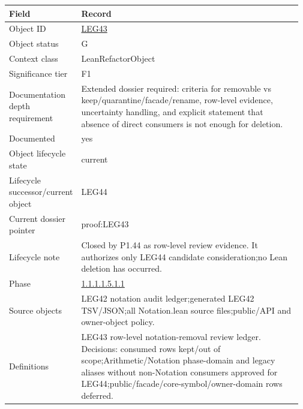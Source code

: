 \begin{longtable}{L{0.16\linewidth} L{0.81\linewidth}}
\hline
\textbf{Field} & \textbf{Record}\\
\hline
Object ID & \hyperlink{object-row-LEG43}{LEG43}\\
\hline\addlinespace[0.20em]
Object status & G\\
\hline\addlinespace[0.20em]
Context class & LeanRefactorObject\\
\hline\addlinespace[0.20em]
Significance tier & F1\\
\hline\addlinespace[0.20em]
Documentation depth requirement & Extended dossier required: criteria for removable vs keep/\allowbreak{}quarantine/\allowbreak{}facade/\allowbreak{}rename, row-level evidence, uncertainty handling, and explicit statement that absence of direct consumers is not enough for deletion.\\
\hline\addlinespace[0.20em]
Documented & yes\\
\hline\addlinespace[0.20em]
Object lifecycle state & current\\
\hline\addlinespace[0.20em]
Lifecycle successor/\allowbreak{}current object & LEG44\\
\hline\addlinespace[0.20em]
Current dossier pointer & proof:LEG43\\
\hline\addlinespace[0.20em]
Lifecycle note & Closed by P1.44 as row-level review evidence. It authorizes only LEG44 candidate consideration;\newline no Lean deletion has occurred.\\
\hline\addlinespace[0.20em]
Phase & \hyperlink{phase-row-1-1-1-1-5-1-1}{1.1.1.1.5.1.1}\\
\hline\addlinespace[0.20em]
Source objects & LEG42 notation audit ledger;\newline generated LEG42 TSV/\allowbreak{}JSON;\newline all Notation.lean source files;\newline public/\allowbreak{}API and owner-object policy.\\
\hline\addlinespace[0.20em]
Definitions & LEG43 row-level notation-removal review ledger. Decisions: consumed rows kept/\allowbreak{}out of scope;\newline Arithmetic/\allowbreak{}Notation phase-domain and legacy aliases without non-Notation consumers approved for LEG44;\newline public/\allowbreak{}facade/\allowbreak{}core-symbol/\allowbreak{}owner-domain rows deferred.\\

\end{longtable}
